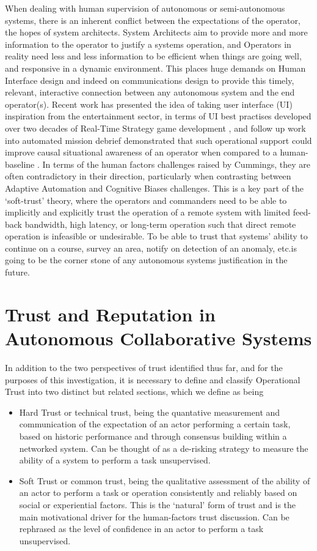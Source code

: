 When dealing with human supervision of autonomous or semi-autonomous systems, there is an inherent conflict between the expectations of the operator, the hopes of system architects.
System Architects aim to provide more and more information to the operator to justify a systems operation, and Operators in reality need less and less information to be efficient when things are going well, and responsive in a dynamic environment.
This places huge demands on Human Interface design and indeed on communications design to provide this timely, relevant, interactive connection between any autonomous system and the end operator(s).
Recent work has presented the idea of taking user interface (UI) inspiration from the entertainment sector, in terms of UI best practises developed over two decades of Real-Time Strategy game development \cite{Johnson2007}, and follow up work into automated mission debrief demonstrated that such operational support could improve causal situational awareness of an operator when compared to a human-baseline \cite{Johnson2011}.
In terms of the human factors challenges raised by Cummings, they are often contradictory in their direction, particularly when contrasting between Adaptive Automation and Cognitive Biases challenges.
This is a key part of the ‘soft-trust’ theory, where the operators and commanders need to be able to implicitly and explicitly trust the operation of a remote system with limited feed-back bandwidth, high latency, or long-term operation such that direct remote operation is infeasible or undesirable.
To be able to trust that systems’ ability to continue on a course, survey an area, notify on detection of an anomaly, etc.is going to be the corner stone of any autonomous systems justification in the future.

\section{Trust and Reputation in Autonomous Collaborative Systems}

In addition to the two perspectives of trust identified thus far, and for the purposes of this investigation, it is necessary to define and classify Operational Trust into two distinct but related sections, which we define as being

\begin{itemize}
	\item Hard Trust or technical trust, being the quantative measurement and communication of the expectation of an actor performing a certain task, based on historic performance and through consensus building within a networked system.
	Can be thought of as a de-risking strategy to measure the ability of a system to perform a task unsupervised.
	
	\item Soft Trust or common trust, being the qualitative assessment of the ability of an actor to perform a task or operation consistently and reliably based on social or experiential factors.
	This is the ‘natural’ form of trust and is the main motivational driver for the human-factors trust discussion.
	Can be rephrased as the level of confidence in an actor to perform a task unsupervised.
\end{itemize}

